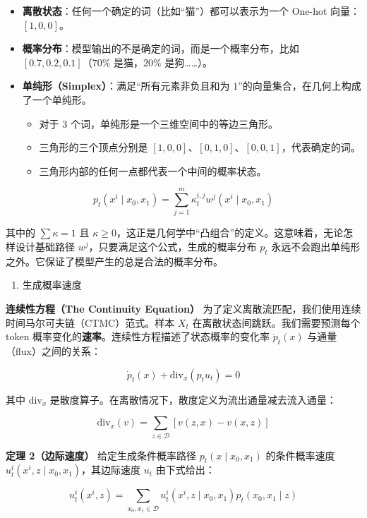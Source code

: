 \begin{itemize}
\tightlist
\item
  \textbf{离散状态}：任何一个确定的词（比如``猫''）都可以表示为一个 One-hot 向量：\([1,0,0]\)。
\item
  \textbf{概率分布}：模型输出的不是确定的词，而是一个概率分布，比如 \([0.7,0.2,0.1]\)（\(70\%\) 是猫，\(20\%\) 是狗\ldots\ldots）。
\item
  \textbf{单纯形（Simplex）}：满足``所有元素非负且和为 \(1\)''的向量集合，在几何上构成了一个单纯形。

  \begin{itemize}
  \tightlist
  \item
    对于 3 个词，单纯形是一个三维空间中的等边三角形。
  \item
    三角形的三个顶点分别是 \([1,0,0]\)、\([0,1,0]\)、\([0,0,1]\)，代表确定的词。
  \item
    三角形内部的任何一点都代表一个中间的概率状态。
  \end{itemize}
\end{itemize}

\[
p_t(x^i\mid x_0,x_1)=\sum_{j=1}^{m}\kappa_t^{i,j}w^j(x^i\mid x_0,x_1)
\]

其中的 \(\sum \kappa=1\) 且 \(\kappa\ge 0\)，这正是几何学中``凸组合''的定义。这意味着，无论怎样设计基础路径 \(w^j\)，只要满足这个公式，生成的概率分布 \(p_t\) 永远不会跑出单纯形之外。它保证了模型产生的总是合法的概率分布。

\begin{enumerate}
\def\labelenumi{\arabic{enumi}.}
\setcounter{enumi}{1}
\tightlist
\item
  生成概率速度
\end{enumerate}

\textbf{连续性方程（The Continuity Equation）} 为了定义离散流匹配，我们使用连续时间马尔可夫链（CTMC）范式。样本 \(X_t\) 在离散状态间跳跃。我们需要预测每个 token 概率变化的\textbf{速率}。连续性方程描述了状态概率的变化率 \(\dot{p}_t(x)\) 与通量（flux）之间的关系：

\[
\dot{p}_t(x)+\mathrm{div}_x(p_tu_t)=0
\]

其中 \(\mathrm{div}_x\) 是散度算子。在离散情况下，散度定义为流出通量减去流入通量：

\[
\mathrm{div}_x(v)=\sum_{z\in\mathcal{D}}[v(z,x)-v(x,z)]
\]

\textbf{定理 2（边际速度）} 给定生成条件概率路径 \(p_t(x\mid x_0,x_1)\) 的条件概率速度 \(u_t^i(x^i,z\mid x_0,x_1)\)，其边际速度 \(u_t\) 由下式给出：

\[
u_t^i(x^i,z)=\sum_{x_0,x_1\in\mathcal{D}}u_t^i(x^i,z\mid x_0,x_1)p_t(x_0,x_1\mid z)
\]

